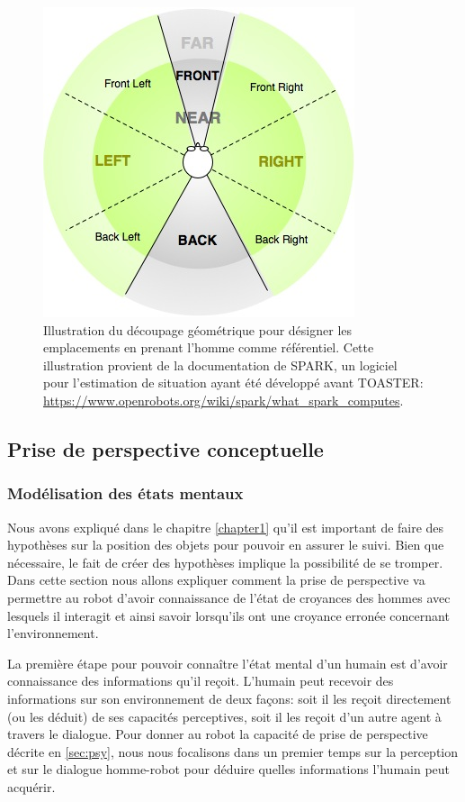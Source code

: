 \documentclass[a4paper,11pt,twoside]{StyleThese}
\begin{document}
\begin{figure}[ht!]
 \centering
  \includegraphics[width=0.59\linewidth]{./img/relative_position.jpg} 
  \caption {Illustration du découpage géométrique pour désigner les emplacements en prenant l'homme comme référentiel. Cette illustration provient de la documentation de SPARK, un logiciel pour l'estimation de situation ayant été développé avant TOASTER: \url{https://www.openrobots.org/wiki/spark/what_spark_computes}.}
  \label{fig:relativePose}
\end{figure}


\subsection{Prise de perspective conceptuelle}
\label{sec:beliefm}
\subsubsection{Modélisation des états mentaux}
Nous avons expliqué dans le chapitre \ref{chapter1} qu'il est important de faire des hypothèses sur la position des objets pour pouvoir en assurer le suivi. Bien que nécessaire, le fait de créer des hypothèses implique la possibilité de se tromper.
Dans cette section nous allons expliquer comment la prise de perspective va permettre au robot d'avoir connaissance de l'état de croyances des hommes avec lesquels il interagit et ainsi savoir lorsqu'ils ont une croyance erronée concernant l'environnement.

La première étape pour pouvoir connaître l'état mental d'un humain est d'avoir connaissance des informations qu'il reçoit. L'humain peut recevoir des informations sur son environnement de deux façons: soit il les reçoit directement (ou les déduit) de ses capacités perceptives, soit il les reçoit d'un autre agent à travers le dialogue.
Pour donner au robot la capacité de prise de perspective décrite en \ref{sec:psy}, nous nous focalisons dans un premier temps sur la perception et sur le dialogue homme-robot pour déduire quelles informations l'humain peut acquérir.
\end{document}
